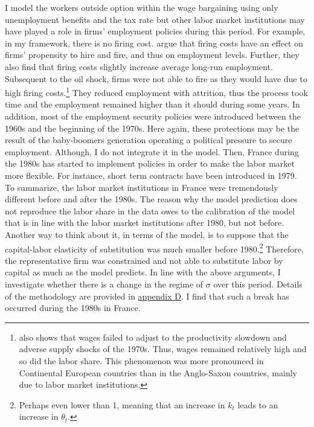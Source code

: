 I model the workers outside option within the wage bargaining using only unemployment benefits and the tax rate but other labor market institutions may have played a role in firms' employment policies during this period. For example, in my framework, there is no firing cost. \cite{Bentolila1990} argue that firing costs have an effect on firms' propensity to hire and fire, and thus on employment levels. Further, they also find that firing costs slightly increase average long-run employment. Subsequent to the oil shock, firms were not able to fire as they would have due to high firing costs.\footnote{\cite{Blanchard1997} also shows that wages failed to adjust to the productivity slowdown and adverse supply shocks of the 1970s. Thus, wages remained relatively high and so did the labor share. This phenomenon was more pronounced in Continental European countries than in the Anglo-Saxon countries, mainly due to labor market institutions.} They reduced employment with attrition, thus the process took time and the employment remained higher than it should during some years. In addition, most of the employment security policies were introduced between the 1960s and the beginning of the 1970s. Here again, these protections may be the result of the baby-boomers generation operating a political pressure to secure employment. Although, I do not integrate it in the model. Then, France during the 1980s has started to implement policies in order to make the labor market more flexible. For instance, short term contracts have been introduced in 1979. To summarize, the labor market institutions in France were tremendously different before and after the 1980s. The reason why the model prediction does not reproduce the labor share in the data owes to the calibration of the model that is in line with the labor market institutions after 1980, but not before. Another way to think about it, in terms of the model, is to suppose that the capital-labor elasticity of substitution was much smaller before 1980.\footnote{Perhaps even lower than 1, meaning that an increase in $k_t$ leads to an increase in $\theta_t$.} Therefore, the representative firm was constrained and not able to substitute labor by capital as much as the model predicts.
In line with the above arguments, I investigate whether there is a change in the regime of $\sigma$ over this period. Details of the methodology are provided in \hyperref[appendix:regime]{appendix D}. I find that such a break has occurred during the 1980s in France. 

